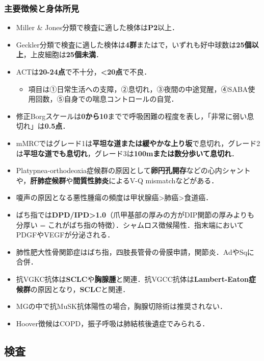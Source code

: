 \subsubsection{主要徴候と身体所見}
\begin{itemize}
\item Miller \& Jones分類で検査に適した検体は\textbf{P2}以上．
\item Geckler分類で検査に適した検体は\textbf{4群}またはで，いずれも好中球数は\textbf{25個以上}，上皮細胞は\textbf{25個未満}．
\item ACTは\textbf{20-24点}で不十分，\textbf{<20点}で不良．
\begin{itemize}
\item 項目は①日常生活への支障，②息切れ，③夜間の中途覚醒，④SABA使用回数，⑤自身での喘息コントロールの自覚．
\end{itemize}
\item 修正Borgスケールは\textbf{0から10}までで呼吸困難の程度を表し，「非常に弱い息切れ」は\textbf{0.5点}．
\item mMRCではグレード1は\textbf{平坦な道または緩やかな上り坂}で息切れ，グレード2は\textbf{平坦な道でも息切れ}，グレード3は\textbf{100mまたは数分歩いて息切れ}．
\item Platypnea-orthodeoxia症候群の原因として\textbf{卵円孔開存}などの心内シャントや，\textbf{肝肺症候群}や\textbf{間質性肺炎}によるV-Q mismatchなどがある．
\item 嗄声の原因となる悪性腫瘍の頻度は甲状腺癌>肺癌>食道癌．
\item ばち指では\textbf{DPD/IPD>1.0}（爪甲基部の厚みの方がDIP関節の厚みよりも分厚い = これがばち指の特徴）．シャムロス徴候陽性．指末端においてPDGFやVEGFが分泌される．
\item 肺性肥大性骨関節症はばち指，四肢長管骨の骨膜申請，関節炎．AdやSqに合併．
\item 抗VGKC抗体は\textbf{SCLC}や\textbf{胸腺腫}と関連．抗VGCC抗体は\textbf{Lambert-Eaton症候群}の原因となり，\textbf{SCLC}と関連．
\item MGの中で抗MuSK抗体陽性の場合，胸腺切除術は推奨されない．
\item Hoover徴候はCOPD，振子呼吸は肺結核後遺症でみられる．

\end{itemize}
\subsection{検査}

